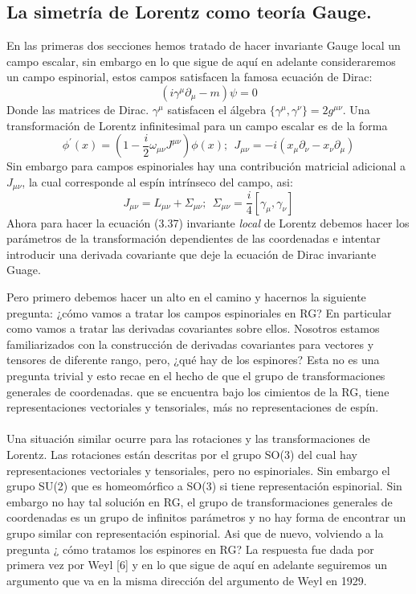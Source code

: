 \subsection{La simetría de Lorentz como teoría Gauge.}
En las primeras dos secciones hemos tratado de hacer invariante Gauge local un campo escalar, sin embargo en lo que sigue de aquí en adelante consideraremos un campo espinorial, estos campos satisfacen la famosa ecuación de Dirac:
\begin{equation}
(i\gamma^\mu\partial_\mu-m)\psi=0
\end{equation}		
Donde las matrices de Dirac. $\gamma^\mu$ satisfacen el álgebra $\{\gamma^\mu,\gamma^\nu\}=2g^{\mu\nu}$. Una transformación de Lorentz infinitesimal para un campo escalar es de la forma 
\begin{equation}
\phi^\prime(x)=\left(1-\frac{i}{2}\omega_{\mu\nu}J^{\mu\nu}\right)\phi(x);\ \ J_{\mu\nu}=-i(x_\mu\partial_\nu-x_\nu\partial_\mu) 
\end{equation} 
Sin embargo para campos espinoriales hay una contribución matricial adicional a $J_{\mu\nu}$, la cual corresponde al espín intrínseco del campo, asi:
\begin{equation}
J_{\mu\nu}=L_{\mu\nu}+\Sigma_{\mu\nu};\ \ \Sigma_{\mu\nu}=\frac{i}{4}[\gamma_\mu,\gamma_\nu]
\end{equation}
Ahora para hacer la ecuación (3.37) invariante \textit{local} de Lorentz debemos hacer los parámetros de la transformación dependientes de las coordenadas e intentar introducir una derivada covariante que deje la ecuación de Dirac invariante Guage.

Pero primero debemos hacer un alto en el camino y hacernos la siguiente pregunta: ¿cómo vamos a tratar los campos espinoriales en RG? En particular como vamos a tratar las derivadas covariantes sobre ellos. Nosotros estamos familiarizados con la construcción de derivadas covariantes para vectores y tensores de diferente rango, pero, ¿qué hay de los espinores? Esta no es una pregunta trivial y esto recae en el hecho de que el grupo de transformaciones generales de coordenadas. que se encuentra bajo los cimientos de la RG, tiene representaciones vectoriales y tensoriales, más no representaciones de espín.
\\
\\
Una situación similar ocurre para las rotaciones y las transformaciones de Lorentz. Las rotaciones están descritas por el grupo SO(3) del cual hay representaciones vectoriales y tensoriales, pero no espinoriales. Sin embargo el grupo SU(2) que es homeomórfico a SO(3) si tiene representación espinorial. Sin embargo no hay tal solución en RG, el grupo de transformaciones generales de coordenadas es un grupo de infinitos parámetros y no hay forma de encontrar un grupo similar con representación espinorial. Asi que de nuevo, volviendo a la pregunta ¿ cómo tratamos los espinores en RG? La respuesta fue dada por primera vez por Weyl [6] y en lo que sigue de aquí en adelante seguiremos un argumento que va en la misma dirección del argumento de Weyl en 1929. 

